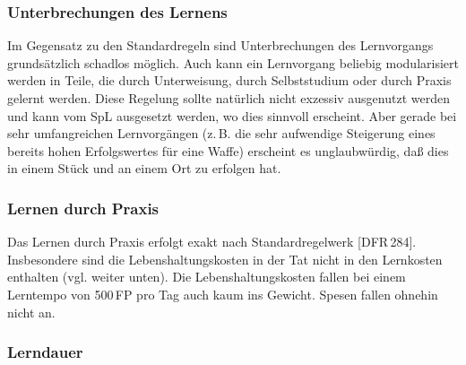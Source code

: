 \documentclass[10pt,a4paper,germanpar]{article}
\begin{document}

\subsubsection{Unterbrechungen des Lernens}

Im Gegensatz zu den Standardregeln sind Unterbrechungen des
Lernvorgangs grundsätzlich schadlos möglich. Auch kann ein Lernvorgang
beliebig modularisiert werden in Teile, die durch Unterweisung, durch
Selbststudium oder durch Praxis gelernt werden. Diese Regelung sollte
natürlich nicht exzessiv ausgenutzt werden und kann vom SpL
ausgesetzt werden, wo dies sinnvoll erscheint.  Aber gerade bei sehr
umfangreichen Lernvorgängen (z.\,B. die sehr aufwendige Steigerung
eines bereits hohen Erfolgswertes für eine Waffe) erscheint es
un\-glaub\-wür\-dig, daß dies in einem Stück und an einem Ort zu erfolgen
hat.

\subsubsection{Lernen durch Praxis}

Das Lernen durch Praxis erfolgt exakt nach Standardregelwerk
[DFR\,284]. Insbesondere sind die Lebenshaltungskosten in der Tat
nicht in den Lernkosten enthalten (vgl. weiter unten). Die
Lebenshaltungskosten fallen bei einem Lerntempo von 500\,FP pro Tag
auch kaum ins Gewicht. Spesen fallen ohnehin nicht an.

\subsubsection{Lerndauer}
\end{document}
